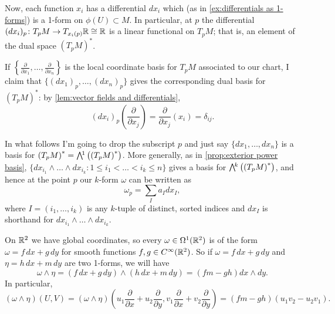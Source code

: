 Now, each function $x_i$ has a differential $dx_i$ which (as in \cref{ex:differentials as 1-forms}) is a 1-form on $\phi(U) \subset M$. In particular, at $p$ the differential $(dx_i)_p \colon\thinspace\! T_p M \to T_{x_i(p)}\mathbb{R} \cong \mathbb{R}$ is a linear functional on $T_pM$; that is, an element of the dual space $\left(T_pM\right)^\ast$.

If $\left\{\frac{\partial}{\partial x_1}, \dots , \frac{\partial}{\partial x_n}\right\}$ is the local coordinate basis for $T_pM$ associated to our chart, I claim that $\{(dx_1)_p, \dots , (dx_n)_p\}$ gives the corresponding dual basis for $\left(T_pM\right)^\ast$: by \cref{lem:vector fields and differentials},
\[
	(dx_i)_p \left(\frac{\partial}{\partial x_j}\right) = \frac{\partial}{\partial x_j}(x_i) = \delta_{ij}.
\]

In what follows I'm going to drop the subscript $p$ and just say $\{dx_1, \dots, dx_n\}$ is a basis for $\left(T_pM\right)^\ast = \ext{1}\left(\left(T_pM\right)^\ast\right)$. More generally, as in \cref{prop:exterior power basis}, $\{dx_{i_1} \wedge \dots \wedge dx_{i_k}: 1 \leq i_1 < \dots < i_k \leq n\}$ gives a basis for $\ext{k}\left(\left(T_pM\right)^\ast \right)$, and hence at the point $p$ our $k$-form $\omega$ can be written as
\[
	\omega_p = \sum_I a_I dx_I,
\]
where $I = (i_1, \dots , i_k)$ is any $k$-tuple of distinct, sorted indices and $dx_I$ is shorthand for $dx_{i_1} \wedge \dots \wedge dx_{i_k}$.

\begin{example}
	On $\mathbb{R}^2$ we have global coordinates, so every $\omega \in \Omega^1(\mathbb{R}^2)$ is of the form $\omega = f\, dx + g\, dy$ for smooth functions $f,g \in C^\infty (\mathbb{R}^2)$. So if $\omega = f\, dx + g \, dy$ and $\eta = h\, dx + m\, dy$ are two 1-forms, we will have
	\[
		\omega \wedge \eta = (f\, dx + g\, dy) \wedge (h\, dx + m\, dy) = (fm - gh) dx \wedge dy.
	\]
	In particular,
	\[
		(\omega \wedge \eta)(U,V) = (\omega \wedge \eta)\left(u_1 \frac{\partial}{\partial x} + u_2 \frac{\partial}{\partial y}, v_1 \frac{\partial}{\partial x} + v_2 \frac{\partial}{\partial y}\right) = (fm-gh)(u_1 v_2 - u_2 v_1).
	\]
\end{example}

